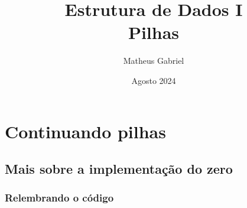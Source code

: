 \documentclass{article}
\title{Estrutura de Dados I
\\ \large Pilhas}
\author{Matheus Gabriel}
\date{Agosto 2024}
\begin{document}
\maketitle

\section{Continuando pilhas}

\subsection{Mais sobre a implementação do zero}

\subsubsection{Relembrando o código}
\end{document}
